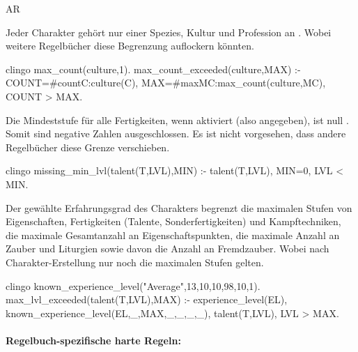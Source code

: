 \begin{enumerateWithCode}{AR}
    \item\label{itm:AR.1} Jeder Charakter gehört nur einer Spezies, Kultur und Profession an .
    Wobei weitere Regelbücher diese Begrenzung auflockern könnten.
    \begin{mintedNameless}{clingo}
max_count(culture,1). %
max_count_exceeded(culture,MAX) :- COUNT=#count{C:culture(C)}, MAX=#max{MC:max_count(culture,MC)}, COUNT > MAX.
    \end{mintedNameless}

    \item Die Mindeststufe für alle Fertigkeiten, wenn aktiviert (also angegeben), ist null .
    Somit sind negative Zahlen ausgeschlossen.
    Es ist nicht vorgesehen, dass andere Regelbücher diese Grenze verschieben.
    \begin{mintedNameless}{clingo}
missing_min_lvl(talent(T,LVL),MIN) :- talent(T,LVL), MIN=0, LVL < MIN.
    \end{mintedNameless}

    \item Der gewählte Erfahrungsgrad des Charakters begrenzt die maximalen Stufen von Eigenschaften, Fertigkeiten (Talente, Sonderfertigkeiten) und Kampftechniken, die maximale Gesamtanzahl an Eigenschaftspunkten, die maximale Anzahl an Zauber und Liturgien sowie davon die Anzahl an Fremdzauber.
    Wobei nach Charakter-Erstellung nur noch die maximalen Stufen gelten. 
    \begin{mintedNameless}{clingo}
known_experience_level("Average",13,10,10,98,10,1).
max_lvl_exceeded(talent(T,LVL),MAX) :- experience_level(EL), known_experience_level(EL,_,MAX,_,_,_,_), talent(T,LVL), LVL > MAX.
    \end{mintedNameless}
\end{enumerateWithCode}

\pagebreak

\paragraph{Regelbuch-spezifische harte Regeln:}\label{par:HR}

